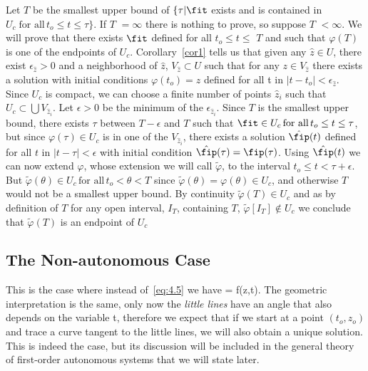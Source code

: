 Let $T$ be the smallest upper bound of $\{\tau | \fit $ exists and is 
contained in $U_c \; \text{for all} \, t_o \leq t \leq \tau \}$.
If $T$ $= \infty $ there is nothing to prove, so suppose $T$ $<
\infty $. We will prove that there exists $\fit $ defined for all $t_o \leq 
t \leq $ $T$ and such that $\varphi (T) $ is one of the endpoints of $U_c $.
Corollary~\ref{cor1} tells us that given any $\hat z \in U$, there exist
$\epsilon_{\hat z} > 0 $ and a neighborhood of $\hat z$, $V_{\hat z} \subset U$ such
that for any $z \in V_{\hat z} $ there exists a solution with
initial conditions $\varphi (t_o) = z$ defined for all t in
$\left| t - t_o \right| < \epsilon_{\hat z} $.
Since $U_c $ is compact, we can choose a finite number of points
${\hat z_i }$ such that $U_c \subset \bigcup V_{\hat z_i}$. 
Let $\epsilon > 0 $ be the minimum of the $\epsilon_{\hat z_i} $.
Since $T$ is the smallest upper bound, there exists $\tau $ between $T -
\epsilon $ and $T$ such that $\fit \in U_c \, \text{for all} \, t_o \leq t \leq \tau $, 
but since 
$\varphi(\tau ) \in U_c $ 
is in one of the $V_{\hat z_i } $, there exists
a solution $\hat{\fip}(t) $ defined for all $t$ in 
$\left| t - \tau \right|
< \epsilon $ 
with initial condition 
$\hat{\fip}(\tau) = \fip(\tau) $.
Using $\hat{\fip}(t) $ we can now extend $\varphi $, whose extension 
we will call $\tilde\varphi $, to the interval $t_o \leq t < \tau + \epsilon $.
But 
$\tilde\varphi (\theta) \in U_c \, \text{for all} \, t_o < \theta <T$ 
since 
$\tilde\varphi(\theta) = \varphi(\theta) \in U_c$, 
and otherwise $T$ would not
be a smallest upper bound. By continuity $\tilde\varphi(T)
\in U_c$ and as by definition of $T$ for any open interval, $I_T $,
containing $T$,  $\tilde\varphi[I_T] \not\in U_c $ we conclude that 
$\tilde\varphi(T) $ is an endpoint of $U_c$ \epru

\subsection{The Non-autonomous Case}

This is the case where instead of~\ref{eq:4.5} we have 
\beq 
{} = f(z,t).
\eeq
The geometric interpretation is the same, only now the {\sl
little lines} have an angle that also depends on the variable t,
therefore we expect that if we start at a point $(t_o,z_o)$ and 
trace a curve tangent to the little lines, we will also obtain a unique
solution. This is indeed the case, but its discussion will be 
included in the general theory of first-order autonomous systems
that we will state later.

